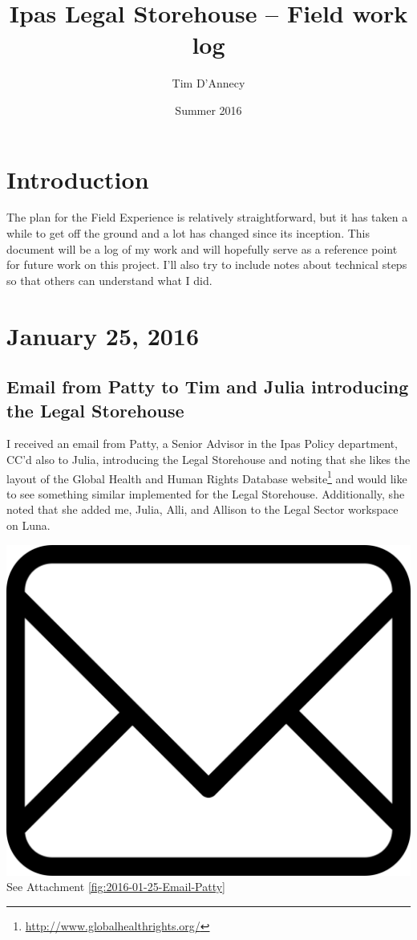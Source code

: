 \documentclass{article}
\title{Ipas Legal Storehouse -- Field work log}
\author{Tim D'Annecy}
\date{Summer 2016}
\begin{document}
\maketitle

\clearpage
\tableofcontents
\listoffigures
\clearpage

\section{Introduction}
The plan for the Field Experience is relatively straightforward, but it has taken a while to get off the ground and a lot has changed since its inception. This document will be a log of my work and will hopefully serve as a reference point for future work on this project. I'll also try to include notes about technical steps so that others can understand what I did.

\section{January 25, 2016}
\subsection{Email from Patty to Tim and Julia introducing the Legal Storehouse}
I received an email from Patty, a Senior Advisor  in the Ipas Policy department, CC'd also to Julia, introducing the Legal Storehouse and noting that she likes the layout of the Global Health and Human Rights Database website\footnote{\url{http://www.globalhealthrights.org/}} and would like to see something similar implemented for the Legal Storehouse. Additionally, she noted that she added me, Julia, Alli, and Allison to the Legal Sector workspace on Luna.

\vspace{2em}
\noindent\includegraphics[height=\fontcharht\font`\B]{icons/attachment-email} See Attachment \ref{fig:2016-01-25-Email-Patty}
\vspace{2em}
\end{document}
